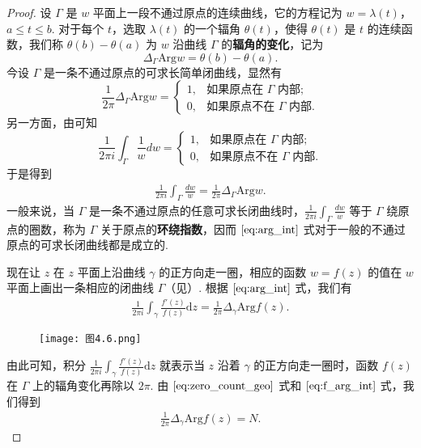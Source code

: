 \documentclass[../../main.tex]{subfiles}
\begin{document}
\begin{proof}
 设 \( \Gamma \) 是 \( w \) 平面上一段不通过原点的连续曲线，它的方程记为 \( w = \lambda(t) \)，\( a \leqslant  t \leqslant  b \). 对于每个 \( t \)，选取 \( \lambda(t) \) 的一个辐角 \( \theta(t) \)，使得 \( \theta(t) \) 是 \( t \) 的连续函数，我们称 \( \theta(b) - \theta(a) \) 为 \( w \) 沿曲线 \( \Gamma \) 的\textbf{辐角的变化}，记为
\[
\Delta_{\Gamma} \text{Arg} w = \theta(b) - \theta(a).
\]
今设 \( \Gamma \) 是一条不通过原点的可求长简单闭曲线，显然有
\[
\frac{1}{2\pi} \Delta_{\Gamma} \text{Arg} w = 
\begin{cases} 
1, & \text{如果原点在 } \Gamma \text{ 内部}; \\
0, & \text{如果原点不在 } \Gamma \text{ 内部}.
\end{cases}
\]
另一方面，由可知
\[
\frac{1}{2\pi i} \int_{\Gamma} \frac{1}{w} dw = 
\begin{cases} 
1, & \text{如果原点在 } \Gamma \text{ 内部}; \\
0, & \text{如果原点不在 } \Gamma \text{ 内部}.
\end{cases}
\]
于是得到
\begin{align}
\frac{1}{2\pi i} \int_{\Gamma} \frac{dw}{w} = \frac{1}{2\pi} \Delta_{\Gamma} \text{Arg} w. \label{eq:arg_int}
\end{align}
一般来说，当 \( \Gamma \) 是一条不通过原点的任意可求长闭曲线时，\( \frac{1}{2\pi i} \int_{\Gamma} \frac{dw}{w} \) 等于 \( \Gamma \) 绕原点的圈数，称为 \( \Gamma \) 关于原点的\textbf{环绕指数}，因而 \(\eqref{eq:arg_int}\) 式对于一般的不通过原点的可求长闭曲线都是成立的.

现在让 \( z \) 在 \( z \) 平面上沿曲线 \( \gamma \) 的正方向走一圈，相应的函数 \( w = f(z) \) 的值在 \( w \) 平面上画出一条相应的闭曲线 \( \Gamma \)（见）. 根据 \(\eqref{eq:arg_int}\) 式，我们有
\begin{align}
\frac{1}{2\pi i} \int_{\gamma} \frac{f'(z)}{f(z)} \mathrm{d}z = \frac{1}{2\pi} \Delta_{\gamma} \text{Arg} f(z). \label{eq:f_arg_int}
\end{align}
\begin{figure}[H]
\centering
\texttt{[image: 图4.6.png]}
\caption{}
\label{figure:图4.6}
\end{figure}
由此可知，积分 \( \frac{1}{2\pi i} \int_{\gamma} \frac{f'(z)}{f(z)} \mathrm{d}z \) 就表示当 \( z \) 沿着 \( \gamma \) 的正方向走一圈时，函数 \( f(z) \) 在 \( \Gamma \) 上的辐角变化再除以 \( 2\pi \). 由 \(\eqref{eq:zero_count_geo}\) 式和 \(\eqref{eq:f_arg_int}\) 式，我们得到
\begin{align}
\frac{1}{2\pi} \Delta_{\gamma} \text{Arg} f(z) = N. \label{eq:arg_zero}
\end{align}

\end{proof}
\end{document}
